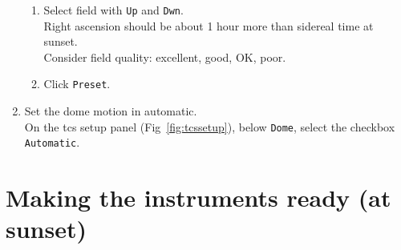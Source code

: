 \documentclass[11pt,fleqn]{book} %
\begin{document}
\begin{enumerate}
\begin{enumerate}
            \item Select field with \texttt{Up} and \texttt{Dwn}.\\
                  Right ascension should be about 1 hour more than sidereal time at sunset.\\
                  Consider field quality: excellent, good, OK, poor.
            \item Click \texttt{Preset}.
            \end{enumerate}      
         \item Set the dome motion in automatic.\label{list:domeauto}\\
               On the \gls{tcs} setup panel (Fig~\ref{fig:tcssetup}), below \texttt{Dome}, select the checkbox \texttt{Automatic}.
\end{enumerate}


\section{Making the instruments ready (at sunset)}
\label{sec:insprep}
\end{document}
